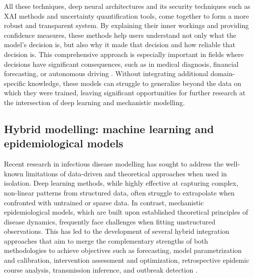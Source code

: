 All these techniques, deep neural architectures and its security techniques such as XAI methods and uncertainty quantification tools, come together to form a more robust and transparent system. By explaining their inner workings and providing confidence measures, these methods help users understand not only what the model’s decision is, but also why it made that decision and how reliable that decision is. This comprehensive approach is especially important in fields where decisions have significant consequences, such as in medical diagnosis, financial forecasting, or autonomous driving \cite{hinton2012deep, bengio2013representation}. Without integrating additional domain-specific knowledge, these models can struggle to generalize beyond the data on which they were trained, leaving significant opportunities for further research at the intersection of deep learning and mechanistic modelling. 


\subsection{Hybrid modelling: machine learning and epidemiological models}

Recent research in infectious disease modelling has sought to address the well‐known limitations of data‐driven and theoretical approaches when used in isolation. Deep learning methods, while highly effective at capturing complex, non-linear patterns from structured data, often struggle to extrapolate when confronted with untrained or sparse data. In contrast, mechanistic epidemiological models, which are built upon established theoretical principles of disease dynamics, frequently face challenges when fitting unstructured observations. This has led to the development of several hybrid integration approaches that aim to merge the complementary strengths of both methodologies to achieve objectives such as forecasting, model parametrization and calibration, intervention assessment and optimization, retrospective epidemic course analysis, transmission inference, and outbreak detection \cite{Ye2025}.

